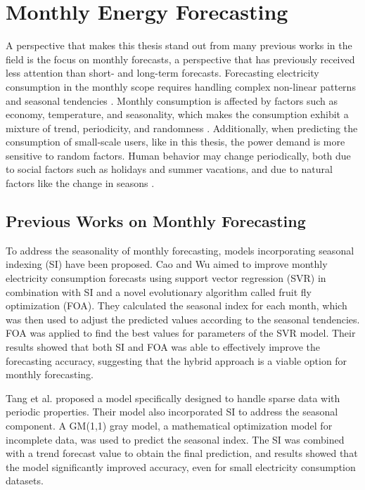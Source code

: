 \section{Monthly Energy Forecasting}


A perspective that makes this thesis stand out from many previous works in the field is the focus on monthly forecasts, a perspective that has previously received less attention than short- and long-term forecasts. Forecasting electricity consumption in the monthly scope requires handling complex non-linear patterns and seasonal tendencies \cite{cao_support_2016}. Monthly consumption is affected by factors such as economy, temperature, and seasonality, which makes the consumption exhibit a mixture of trend, periodicity, and randomness \cite{tang_gm11_2022}. Additionally, when predicting the consumption of small-scale users, like in this thesis, the power demand is more sensitive to random factors. Human behavior may change periodically, both due to social factors such as holidays and summer vacations, and due to natural factors like the change in seasons \cite{sun_monthly_2019}.

\subsection{Previous Works on Monthly Forecasting}

To address the seasonality of monthly forecasting, models incorporating seasonal indexing (SI) have been proposed. Cao and Wu \cite{cao_support_2016} aimed to improve monthly electricity consumption forecasts using support vector regression (SVR) in combination with SI and a novel evolutionary algorithm called fruit fly optimization (FOA). They calculated the seasonal index for each month, which was then used to adjust the predicted values according to the seasonal tendencies. FOA was applied to find the best values for parameters of the SVR model. Their results showed that both SI and FOA was able to effectively improve the forecasting accuracy, suggesting that the hybrid approach is a viable option for monthly forecasting.

Tang et al. \cite{tang_gm11_2022} proposed a model specifically designed to handle sparse data with periodic properties. Their model also incorporated SI to address the seasonal component. A GM(1,1) gray model, a mathematical optimization model for incomplete data, was used to predict the seasonal index. The SI was combined with a trend forecast value to obtain the final prediction, and results showed that the model significantly improved accuracy, even for small electricity consumption datasets.

